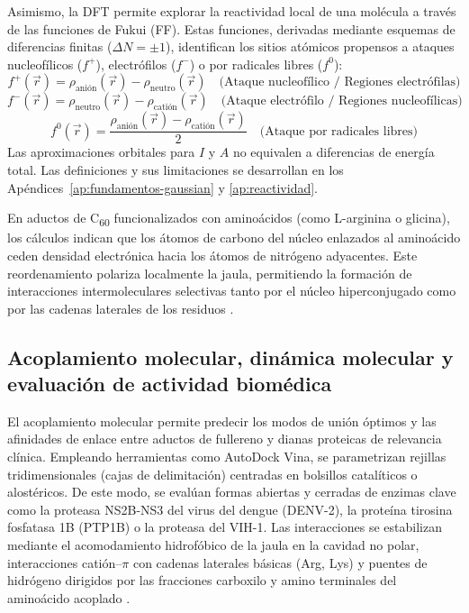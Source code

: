 Asimismo, la DFT permite explorar la reactividad local de una molécula a través de las funciones de Fukui (FF). Estas funciones, derivadas mediante esquemas de diferencias finitas ($\Delta N = \pm 1$), identifican los sitios atómicos propensos a ataques nucleofílicos ($f^+$), electrófilos ($f^-$) o por radicales libres ($f^0$):
\begin{equation}
f^+(\vec{r}) = \rho_{\text{anión}}(\vec{r}) - \rho_{\text{neutro}}(\vec{r}) \quad \text{(Ataque nucleofílico / Regiones electrófilas)}
\end{equation}
\begin{equation}
f^-(\vec{r}) = \rho_{\text{neutro}}(\vec{r}) - \rho_{\text{catión}}(\vec{r}) \quad \text{(Ataque electrófilo / Regiones nucleofílicas)}
\end{equation}
\begin{equation}
f^0(\vec{r}) = \frac{\rho_{\text{anión}}(\vec{r}) - \rho_{\text{catión}}(\vec{r})}{2} \quad \text{(Ataque por radicales libres)}
\end{equation}
Las aproximaciones orbitales para $I$ y $A$ no equivalen a diferencias de energía total. Las definiciones y sus limitaciones se desarrollan en los Apéndices~\ref{ap:fundamentos-gaussian} y \ref{ap:reactividad}.

En aductos de C\textsubscript{60} funcionalizados con aminoácidos (como L-arginina o glicina), los cálculos indican que los átomos de carbono del núcleo enlazados al aminoácido ceden densidad electrónica hacia los átomos de nitrógeno adyacentes. Este reordenamiento polariza localmente la jaula, permitiendo la formación de interacciones intermoleculares selectivas tanto por el núcleo hiperconjugado como por las cadenas laterales de los residuos \cite{moncada2008caracterizacion, gaur2021biomedical}.

\subsection{Acoplamiento molecular, dinámica molecular y evaluación de actividad biomédica}
El acoplamiento molecular permite predecir los modos de unión óptimos y las afinidades de enlace entre aductos de fullereno y dianas proteicas de relevancia clínica. Empleando herramientas como AutoDock Vina, se parametrizan rejillas tridimensionales (cajas de delimitación) centradas en bolsillos catalíticos o alostéricos. De este modo, se evalúan formas abiertas y cerradas de enzimas clave como la proteasa NS2B-NS3 del virus del dengue (DENV-2), la proteína tirosina fosfatasa 1B (PTP1B) o la proteasa del VIH-1. Las interacciones se estabilizan mediante el acomodamiento hidrofóbico de la jaula en la cavidad no polar, interacciones catión--$\pi$ con cadenas laterales básicas (Arg, Lys) y puentes de hidrógeno dirigidos por las fracciones carboxilo y amino terminales del aminoácido acoplado \cite{nelson2022principios,jiang2015synthesis, wang2024strain}.

